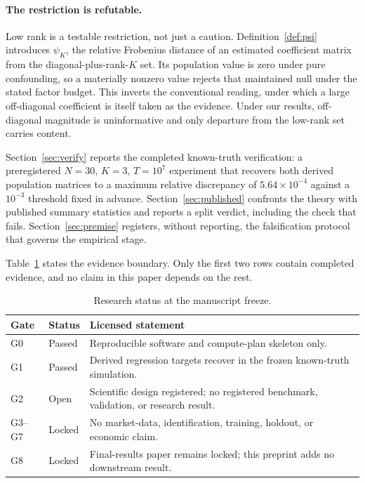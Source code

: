 \documentclass[10pt,twocolumn]{article}
\theoremstyle{remark}
\begin{document}
\paragraph{The restriction is refutable.}
Low rank is a testable restriction, not just a caution.
Definition~\ref{def:psi} introduces $\psi_K$, the relative Frobenius distance
of an estimated coefficient matrix from the diagonal-plus-rank-$K$ set. Its
population value is zero under pure confounding, so a materially nonzero value
rejects that maintained null under the stated factor budget. This inverts the
conventional reading, under which a large off-diagonal coefficient is itself
taken as the evidence. Under our results, off-diagonal magnitude is
uninformative and only departure from the low-rank set carries content.

Section~\ref{sec:verify} reports the completed known-truth verification: a
preregistered $N=30$, $K=3$, $T=10^{7}$ experiment that recovers both derived
population matrices to a maximum relative discrepancy of
$5.64\times10^{-4}$ against a $10^{-3}$ threshold fixed in advance.
Section~\ref{sec:published} confronts the theory with published summary
statistics and reports a split verdict, including the check that fails.
Section~\ref{sec:premise} registers, without reporting, the falsification
protocol that governs the empirical stage.

Table~\ref{tab:status} states the evidence boundary. Only the first two rows
contain completed evidence, and no claim in this paper depends on the rest.

\begin{table}[t]
\centering
\caption{Research status at the manuscript freeze.}
\label{tab:status}
\small
\begin{tabular}{@{}p{}p{}p{}@{}}
\toprule
Gate & Status & Licensed statement \\
\midrule
G0 & Passed & Reproducible software and compute-plan skeleton only. \\
G1 & Passed & Derived regression targets recover in the frozen known-truth simulation. \\
G2 & Open & Scientific design registered; no registered benchmark, validation, or research result. \\
G3--G7 & Locked & No market-data, identification, training, holdout, or economic claim. \\
G8 & Locked & Final-results paper remains locked; this preprint adds no downstream result. \\
\bottomrule
\end{tabular}
\end{table}
\end{document}
